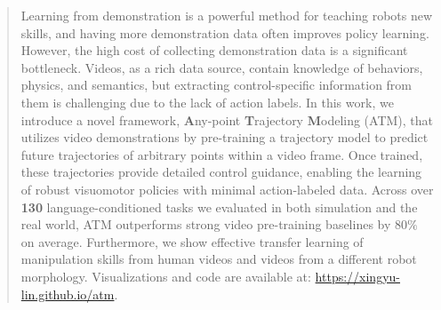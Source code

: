 \begin{abstract}
Learning from demonstration is a powerful method for teaching robots new skills, and having more demonstration data often improves policy learning. However, the high cost of collecting demonstration data is a significant bottleneck. Videos, as a rich data source, contain knowledge of behaviors, physics, and semantics, but extracting control-specific information from them is challenging due to the lack of action labels. In this work, we introduce a novel framework, \textbf{A}ny-point \textbf{T}rajectory \textbf{M}odeling (ATM), that utilizes video demonstrations by pre-training a trajectory model to predict future trajectories of arbitrary points within a video frame. Once trained, these trajectories provide detailed control guidance, enabling the learning of robust visuomotor policies with minimal action-labeled data. Across over \textbf{130} language-conditioned tasks we evaluated in both simulation and the real world, ATM outperforms strong video pre-training baselines by 80$\%$ on average. Furthermore, we show effective transfer learning of manipulation skills from human videos and videos from a different robot morphology. Visualizations and code are available at: \url{https://xingyu-lin.github.io/atm}.
\end{abstract}